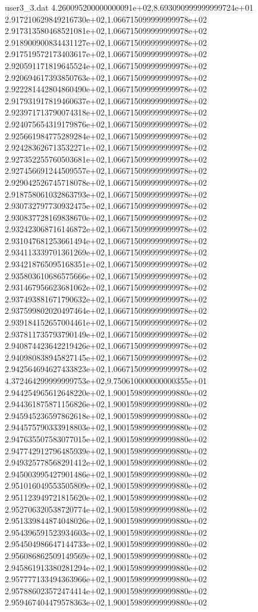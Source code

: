 \begin{filecontents}{user3_3.dat}
4.260095200000000091e+02,8.693090999999999724e+01
2.917210629849216730e+02,1.066715099999999978e+02
2.917313580468521081e+02,1.066715099999999978e+02
2.918900900834431127e+02,1.066715099999999978e+02
2.917519572173403617e+02,1.066715099999999978e+02
2.920591171819645524e+02,1.066715099999999978e+02
2.920694617393850763e+02,1.066715099999999978e+02
2.922281442804860490e+02,1.066715099999999978e+02
2.917931917819460637e+02,1.066715099999999978e+02
2.923971713790074318e+02,1.066715099999999978e+02
2.924075654319179876e+02,1.066715099999999978e+02
2.925661984775289284e+02,1.066715099999999978e+02
2.924283626713532271e+02,1.066715099999999978e+02
2.927352255760503681e+02,1.066715099999999978e+02
2.927456691244509557e+02,1.066715099999999978e+02
2.929042526745718078e+02,1.066715099999999978e+02
2.918758061032863793e+02,1.066715099999999978e+02
2.930732797730932475e+02,1.066715099999999978e+02
2.930837728169838670e+02,1.066715099999999978e+02
2.932423068716146872e+02,1.066715099999999978e+02
2.931047681253661494e+02,1.066715099999999978e+02
2.934113339701361269e+02,1.066715099999999978e+02
2.934218765095168351e+02,1.066715099999999978e+02
2.935803610686575666e+02,1.066715099999999978e+02
2.931467956623681062e+02,1.066715099999999978e+02
2.937493881671790632e+02,1.066715099999999978e+02
2.937599802020497464e+02,1.066715099999999978e+02
2.939184152657004461e+02,1.066715099999999978e+02
2.937811735793790149e+02,1.066715099999999978e+02
2.940874423642219426e+02,1.066715099999999978e+02
2.940980838945827145e+02,1.066715099999999978e+02
2.942564694627433823e+02,1.066715099999999978e+02
4.372464299999999753e+02,9.750610000000000355e+01
2.944254965612648220e+02,1.900159899999999880e+02
2.944361875871156826e+02,1.900159899999999880e+02
2.945945236597862618e+02,1.900159899999999880e+02
2.944575790333918803e+02,1.900159899999999880e+02
2.947635507583077015e+02,1.900159899999999880e+02
2.947742912796485939e+02,1.900159899999999880e+02
2.949325778568291412e+02,1.900159899999999880e+02
2.945003995427901486e+02,1.900159899999999880e+02
2.951016049553505809e+02,1.900159899999999880e+02
2.951123949721815620e+02,1.900159899999999880e+02
2.952706320538720774e+02,1.900159899999999880e+02
2.951339844874048026e+02,1.900159899999999880e+02
2.954396591523934603e+02,1.900159899999999880e+02
2.954504986647144733e+02,1.900159899999999880e+02
2.956086862509149569e+02,1.900159899999999880e+02
2.945861913380281294e+02,1.900159899999999880e+02
2.957777133494363966e+02,1.900159899999999880e+02
2.957886023572474414e+02,1.900159899999999880e+02
2.959467404479578363e+02,1.900159899999999880e+02

\end{filecontents}
